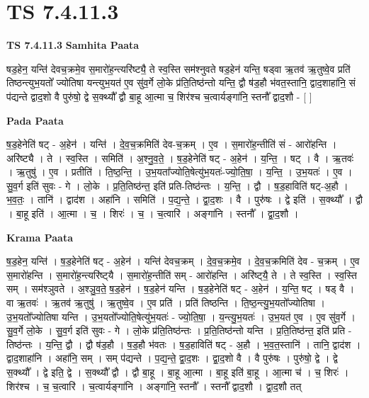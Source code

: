 \documentclass[17pt]{extarticle}
\begin{document}
\section{ TS 7.4.11.3 }

\textbf{TS 7.4.11.3 } \newline
\textbf{Samhita Paata} \newline

षड॒हेन॒ यन्ति॑ देवच॒क्रमे॒व स॒मारो॑ह॒न्त्यरि॑ष्ट्यै॒ ते स्व॒स्ति सम॑श्नुवते षड॒हेन॑ यन्ति॒ षड्वा ऋ॒तव॑ ऋ॒तुष्वे॒व प्रति॑ तिष्ठन्त्युभ॒यतो᳚ ज्योतिषा यन्त्युभ॒यत॑ ए॒व सु॑व॒र्गे लो॒के प्र॑ति॒तिष्ठ॑न्तो यन्ति॒ द्वौ ष॑ड॒हौ भ॑वत॒स्तानि॒ द्वाद॒शाहा॑नि॒ सं प॑द्यन्ते द्वाद॒शो वै पुरु॑षो॒ द्वे स॒क्थ्यौ᳚ द्वौ बा॒हू आ॒त्मा च॒ शिर॑श्च च॒त्वार्यङ्गा॑नि॒ स्तनौ᳚ द्वाद॒शौ - [  ] \newline

\textbf{Pada Paata} \newline

ष॒ड॒हेनेति॑ षट् - अ॒हेन॑ । यन्ति॑ । दे॒व॒च॒क्रमिति॑ देव-च॒क्रम् । ए॒व । स॒मारो॑ह॒न्तीति॑ सं - आरो॑हन्ति । अरि॑ष्ट्यै । ते । स्व॒स्ति । समिति॑ । अ॒श्नु॒व॒ते॒ । ष॒ड॒हेनेति॑ षट् - अ॒हेन॑ । य॒न्ति॒ । षट् । वै । ऋ॒तवः॑ । ऋ॒तुषु॑ । ए॒व । प्रतीति॑ । ति॒ष्ठ॒न्ति॒ । उ॒भ॒यता᳚ज्योति॒षेत्यु॑भ॒यतः॑-ज्यो॒ति॒षा॒ । य॒न्ति॒ । उ॒भ॒यतः॑ । ए॒व । सु॒व॒र्ग इति॑ सुवः - गे । लो॒के । प्र॒ति॒तिष्ठ॑न्त॒ इति॑ प्रति-तिष्ठ॑न्तः । य॒न्ति॒ । द्वौ । ष॒ड॒हाविति॑ षट्-अ॒हौ । भ॒व॒तः॒ । तानि॑ । द्वाद॑श । अहा॑नि । समिति॑ । प॒द्य॒न्ते॒ । द्वा॒द॒शः । वै । पुरु॑षः । द्वे इति॑ । स॒क्थ्यौ᳚ । द्वौ । बा॒हू इति॑ । आ॒त्मा । च॒ । शिरः॑ । च॒ । च॒त्वारि॑ । अङ्गा॑नि । स्तनौ᳚ । द्वा॒द॒शौ ।  \newline


\textbf{Krama Paata} \newline

ष॒ड॒हेन॒ यन्ति॑ । ष॒ड॒हेनेति॑ षट् - अ॒हेन॑ । यन्ति॑ देवच॒क्रम् । दे॒व॒च॒क्रमे॒व । दे॒व॒च॒क्रमिति॑ देव - च॒क्रम् । ए॒व स॒मारो॑हन्ति । स॒मारो॑ह॒न्त्यरि॑ष्ट्‍यै । स॒मारो॑ह॒न्तीति॑ सम् - आरो॑हन्ति । अरि॑ष्ट्‍यै॒ ते । ते स्व॒स्ति । स्व॒स्ति सम् । सम॑श्ञुवते । अ॒श्ञु॒व॒ते॒ ष॒ड॒हेन॑ । ष॒ड॒हेन॑ यन्ति । ष॒ड॒हेनेति॑ षट् - अ॒हेन॑ । 
य॒न्ति॒ षट् । षड् वै । वा ऋ॒तवः॑ । ऋ॒तव॑ ऋ॒तुषु॑ । ऋ॒तुष्वे॒व । ए॒व प्रति॑ । प्रति॑ तिष्ठन्ति । ति॒ष्ठ॒न्त्यु॒भ॒यतो᳚ज्योतिषा । उ॒भ॒यतो᳚ज्योतिषा यन्ति । उ॒भ॒यतो᳚ज्योति॒षेत्यु॑भ॒यतः॑ - ज्यो॒ति॒षा॒ । य॒न्त्यु॒भ॒यतः॑ । उ॒भ॒यत॑ ए॒व । ए॒व सु॑व॒र्गे । सु॒व॒र्गे लो॒के । सु॒व॒र्ग इति॑ सुवः - गे । लो॒के प्र॑ति॒तिष्ठ॑न्तः । प्र॒ति॒तिष्ठ॑न्तो यन्ति । प्र॒ति॒तिष्ठ॑न्त॒ इति॑ प्रति - तिष्ठ॑न्तः । य॒न्ति॒ द्वौ । द्वौ ष॑ड॒हौ । ष॒ड॒हौ भ॑वतः । ष॒ड॒हाविति॑ षट् - अ॒हौ । भ॒व॒त॒स्तानि॑ । तानि॒ द्वाद॑श । द्वाद॒शाहा॑नि । अहा॑नि॒ सम् । सम् प॑द्यन्ते । प॒द्य॒न्ते॒ द्वा॒द॒शः । द्वा॒द॒शो वै । वै पुरु॑षः । पुरु॑षो॒ द्वे । द्वे स॒क्थ्यौ᳚ । द्वे इति॒ द्वे । स॒क्थ्यौ᳚ द्वौ । द्वौ बा॒हू । बा॒हू आ॒त्मा । बा॒हू इति॑ बा॒हू । आ॒त्मा च॑ । च॒ शिरः॑ । शिर॑श्च । च॒ च॒त्वारि॑ । च॒त्वार्यङ्‍गा॑नि । अङ्‍गा॑नि॒ स्तनौ᳚ । स्तनौ᳚ द्वाद॒शौ । द्वा॒द॒शौ तत् \newline
\end{document}
